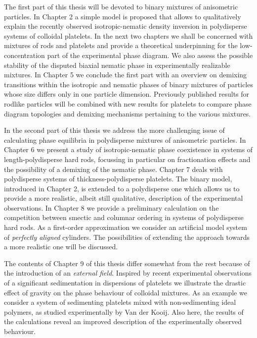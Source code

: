 {The first part of this thesis will be devoted to binary mixtures of anisometric particles.
In Chapter 2 a simple model is proposed that allows to qualitatively explain
the recently observed isotropic-nematic density inversion in polydisperse systems of colloidal platelets.
In the next two chapters  we shall be concerned with mixtures of rods and platelets and
provide a theoretical underpinning for the low-concentration part of the experimental
phase diagram. We also assess the possible stability of the disputed biaxial nematic phase
in experimentally realizable mixtures.
In Chapter 5 we conclude the first part with  an overview on demixing transitions
within the isotropic and nematic phases of binary mixtures of particles
whose size differs only in one particle dimension. Previously published results for rodlike particles
will be combined with new results for platelets to compare phase diagram topologies and
demixing mechanisms pertaining to the various mixtures.

In the second part of this thesis we address the more challenging issue of calculating
phase equilibria in polydisperse mixtures of anisometric particles.
In Chapter 6 we present a study of isotropic-nematic phase coexistence in systems of
length-polydisperse hard rods, focussing in particular on fractionation effects and
the possibility of a demixing of the nematic phase.
Chapter 7 deals with polydisperse systems of thickness-polydisperse
platelets. The binary model, introduced in Chapter 2, is extended to a polydisperse
one which allows us to provide a more realistic, albeit still qualitative, description of the experimental observations.
In Chapter 8 we provide a preliminary
calculation on the competition
between smectic and columnar ordering in systems of polydisperse hard rods.  As a first-order
approximation we consider an artificial model system of {\em perfectly aligned} cylinders. The  possibilities of extending the approach towards a more realistic one will be discussed.


The contents of  Chapter 9 of this thesis differ somewhat from the  rest because of the introduction of an  {\em external field}.
Inspired by recent experimental observations of a significant sedimentation in dispersions of platelets
 we illustrate the drastic effect of gravity
 on the phase behaviour of colloidal mixtures. As an example we consider a system
of sedimenting platelets mixed with non-sedimenting ideal polymers, as studied
experimentally by Van der Kooij. Also here,  the results of the calculations
reveal an improved description of the experimentally observed
behaviour.

}
